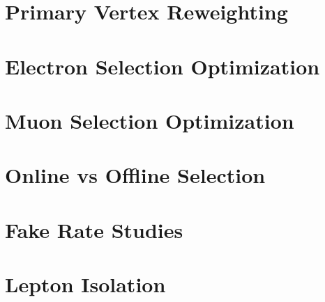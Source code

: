 \documentclass{cmspaper}
\begin{document}


\appendix
\appendixpage
  \section{Primary Vertex Reweighting}
     \label{app:vertex_reweight}
     
  \clearpage
  \section{Electron Selection Optimization}
     \label{app:els}
     
  \clearpage
  \section{Muon Selection Optimization}
     \label{app:mus}
     
  \clearpage
%     
  \clearpage
  \section{Online vs Offline Selection}
     \label{app:online_vs_offline}
     
  \clearpage
  \section{Fake Rate Studies}
     \label{app:fake_rate_studies}
     
     

  \clearpage
  \section{Lepton Isolation}
     \label{app:lepton_isolation}
     

%     
%
%     
\end{document}
